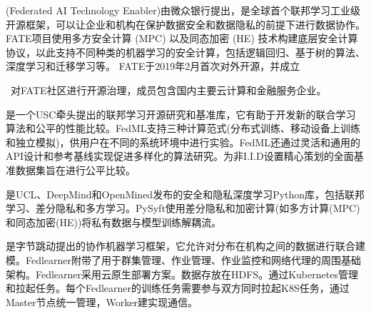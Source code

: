 \documentclass[letterpaper,10pt,english]{sphinxmanual}
\begin{document}
\sphinxAtStartPar
{}%
\begin{footnote}[72]\sphinxAtStartFootnote
{}
%
\end{footnote} (Federated AI Technology
Enabler)由微众银行提出，是全球首个联邦学习工业级开源框架，可以让企业和机构在保护数据安全和数据隐私的前提下进行数据协作。
FATE项目使用多方安全计算 (MPC) 以及同态加密 (HE)
技术构建底层安全计算协议，以此支持不同种类的机器学习的安全计算，包括逻辑回归、基于树的算法、深度学习和迁移学习等。
FATE于2019年2月首次对外开源，并成立 %
\begin{footnote}[73]\sphinxAtStartFootnote
{}
%
\end{footnote} 对FATE社区进行开源治理，成员包含国内主要云计算和金融服务企业。

\sphinxAtStartPar
{}%
\begin{footnote}[74]\sphinxAtStartFootnote
{}
%
\end{footnote}是一个USC牵头提出的联邦学习开源研究和基准库，它有助于开发新的联合学习算法和公平的性能比较。FedML支持三种计算范式(分布式训练、移动设备上训练和独立模拟)，供用户在不同的系统环境中进行实验。FedML还通过灵活和通用的API设计和参考基线实现促进多样化的算法研究。为非I.I.D设置精心策划的全面基准数据集旨在进行公平比较。

\sphinxAtStartPar
{}%
\begin{footnote}[75]\sphinxAtStartFootnote
{}
%
\end{footnote}是UCL、DeepMind和OpenMined发布的安全和隐私深度学习Python库，包括联邦学习、差分隐私和多方学习。PySyft使用差分隐私和加密计算(如多方计算(MPC)和同态加密(HE))将私有数据与模型训练解耦流。

\sphinxAtStartPar
{}%
\begin{footnote}[76]\sphinxAtStartFootnote
{}
%
\end{footnote}是字节跳动提出的协作机器学习框架，它允许对分布在机构之间的数据进行联合建模。Fedlearner附带了用于群集管理、作业管理、作业监控和网络代理的周围基础架构。Fedlearner采用云原生部署方案。数据存放在HDFS。通过Kubernetes管理和拉起任务。每个Fedlearner的训练任务需要参与双方同时拉起K8S任务，通过Master节点统一管理，Worker建实现通信。
\end{document}
